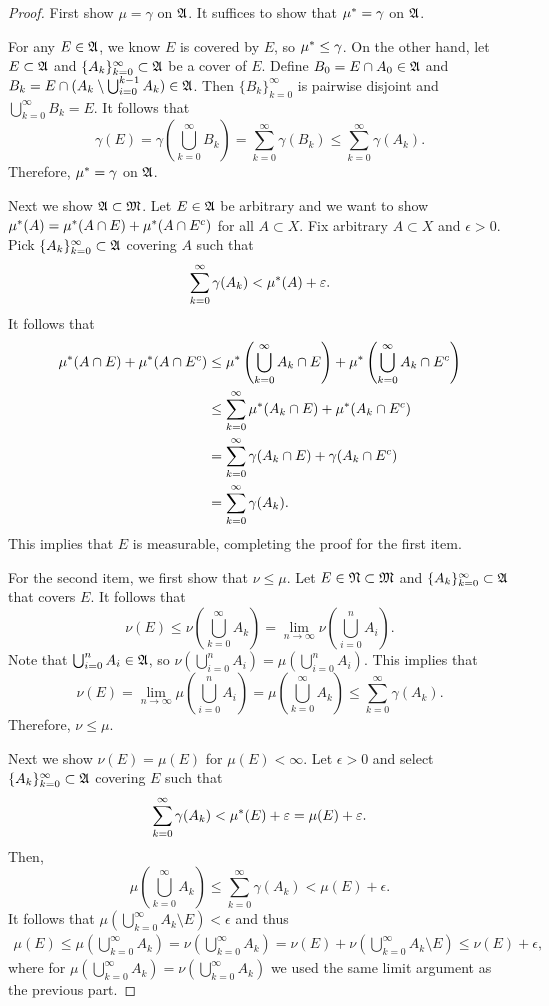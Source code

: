 \documentclass[a4paper]{article}
\renewcommand{\cupinfk}{\bigcup_{k=0}^\infty}
\renewcommand{\suminfk}{\sum_{k=0}^\infty}
\renewcommand{\seqinfk}[1]{\{ #1 \}_{k=0}^\infty}
\renewcommand{\cupi}{\bigcup_{i=0}}
\begin{document}
\begin{proof}
  First show $\mu = \gamma$ on $\mathfrak{A}$. It suffices to show that $\mu^* =
    \gamma$ on $\mathfrak{A}$.

  For any $E \in \mathfrak{A}$, we know $E$ is covered by $E$, so $\mu^* \leq
  \gamma$. On the other hand, let $E \subset \mathfrak{A}$ and $\seqinfk{A_k}
  \subset \afk$ be a cover of $E$. Define $B_0 = E \cap A_0 \in \mathfrak{A}$ and
  $B_k = E \cap (A_k \setminus \cupi^{k-1} A_k) \in \afk$. Then
  $\seqinfk{B_k}$ is pairwise disjoint and $\cupinfk B_k = E$. It follows
  that
  \[
    \gamma(E) = \gamma \left( \cupinfk B_k \right)
    = \suminfk \gamma(B_k) \leq \suminfk \gamma(A_k).
  \]
  Therefore, $\mu^* = \gamma$ on $\mathfrak{A}$.

  Next we show $\mathfrak{A} \subset \mathfrak{M}$. Let $E \in \mathfrak{A}$ be arbitrary and we
  want to show $\mu^*(A) = \mu^*(A \cap E) + \mu^* (A \cap E^c)$ for all $A
  \subset X$. Fix arbitrary $A \subset X$ and $\epsilon > 0$. Pick
  $\seqinfk{A_k} \subset \afk$ covering $A$ such that
  \[
    \suminfk \gamma (A_k) < \om(A) + \epsilon.
  \]
  It follows that
  \[
    \begin{aligned}
      \om(A \cap E) + \om(A \cap E^c)
       & \leq \om \left( \cupinfk A_k \cap E \right)
      + \om \left( \cupinfk A_k \cap E^c \right)              \\
       & \leq \suminfk \om(A_k \cap E) + \om(A_k \cap E^c)    \\
       & = \suminfk \gamma(A_k \cap E) + \gamma(A_k \cap E^c) \\
       & = \suminfk \gamma(A_k).
    \end{aligned}
  \]
  This implies that $E$ is measurable, completing the proof for the first
  item.

  For the second item, we first show that $\nu \leq \mu$. Let $E \in \mathfrak{N}
  \subset \mathfrak{M}$ and $\seqinfk{A_k} \subset \afk$ that covers $E$. It
  follows that
  \[
    \nu(E) \leq \nu \left( \cupinfk A_k \right)
    = \lim_{n \to \infty} \nu \left( \cupi^n A_i \right).
  \]
  Note that $\cupi^n A_i \in \afk$, so $\nu \left( \cupi^n A_i \right) =
  \mu \left( \cupi^n A_i \right)$. This implies that
  \[
    \nu(E) = \lim_{n \to \infty} \mu \left( \cupi^n A_i \right)
    = \mu \left( \cupinfk A_k \right) \leq \suminfk \gamma(A_k).
  \]
  Therefore, $\nu \leq \mu$.

  Next we show $\nu(E) = \mu(E)$ for $\mu(E) < \infty$. Let $\epsilon > 0$
  and select $\seqinfk{A_k} \subset \afk$ covering $E$ such that
  \[
    \suminfk \gamma(A_k) < \om(E) + \epsilon = \mu(E) + \epsilon.
  \]
  Then,
  \[
    \mu \left( \cupinfk A_k \right)
    \leq \suminfk \gamma(A_k) < \mu(E) + \epsilon.
  \]
  It follows that $\mu \left( \cupinfk A_k \setminus E \right) < \epsilon$
  and thus
  \[
    \begin{aligned}
      \mu(E)
      \leq \mu \left( \cupinfk A_k \right)
      = \nu \left( \cupinfk A_k \right)
      = \nu (E) + \nu \left( \cupinfk A_k \setminus E \right)
      \leq \nu(E) + \epsilon,
    \end{aligned}
  \]
  where for $\mu \left( \cupinfk A_k \right) = \nu \left( \cupinfk A_k
  \right)$ we used the same limit argument as the previous part.


\end{proof}
\end{document}
